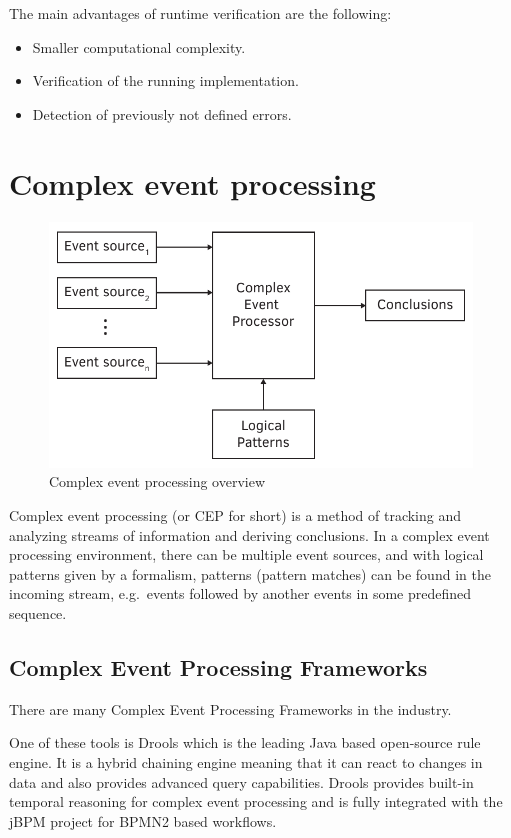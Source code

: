 The main advantages of runtime verification are the following:

\begin{itemize}
	\item Smaller computational complexity.
	\item Verification of the running implementation.
	\item Detection of previously not defined errors.
\end{itemize}

\section{Complex event processing}

\begin{figure}[h]
	\centering
	\includegraphics[width=0.6\linewidth]{figures/chapter_2/CEP}
	\caption{Complex event processing overview \redraw }
	\label{fig:intro:cep}
\end{figure}

Complex event processing (or CEP for short) is a method of tracking and analyzing streams of information and deriving conclusions. In a complex event processing environment, there can be multiple event sources, and with logical patterns given by a formalism, patterns (pattern matches) can be found in the incoming stream, e.g.~events followed by another events in some predefined sequence.

\subsection{Complex Event Processing Frameworks}
There are many Complex Event Processing Frameworks in the industry.

One of these tools is Drools\citep{drools} which is the leading Java based open-source rule engine. It is a hybrid chaining engine meaning that it can react to changes in data and also provides advanced query capabilities. Drools provides built-in temporal reasoning for complex event processing and is fully integrated with the jBPM project for BPMN2 based workflows.

